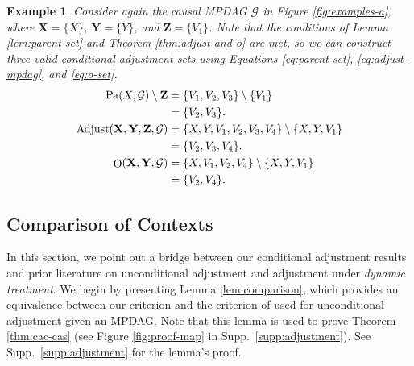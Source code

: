 \documentclass[twoside]{article}
\newtheorem{example}{Example}
\DeclareMathOperator{\Pa}{Pa}
\DeclareMathOperator{\Adjust}{Adjust}
\DeclareMathOperator{\Opt}{O}
\newcommand{\opt}[2][X,Y]{\Opt(\mb{#1},#2)}
\newcommand{\mb}[1]{\mathbf{#1}}
\newcommand{\g}[1][G]{\mathcal{#1}}
\begin{document}
\begin{example}
\label{ex:construct}
    Consider again the causal MPDAG $\g$ in Figure \ref{fig:examples-a}, where $\mb{X} = \{X\}$, $\mb{Y} = \{Y\}$, and $\mb{Z} = \{V_1\}$. Note that the conditions of Lemma \ref{lem:parent-set} and Theorem \ref{thm:adjust-and-o} are met, so we can construct three valid conditional adjustment sets using Equations \eqref{eq:parent-set}, \eqref{eq:adjust-mpdag}, and \eqref{eq:o-set}.
    \begingroup
    \allowdisplaybreaks
    \begin{align}
        \Pa(X, \g) \setminus \mb{Z} &= \{V_1,V_2,V_3\} \setminus \{V_1\} \notag\\
        &= \{V_2,V_3\}. \nonumber\\
        \Adjust(\mb{X,Y,Z},\g) &= \{X,Y, V_1,V_2,V_3,V_4\} \setminus \{X,Y,V_1\} \nonumber\\
        &= \{V_2,V_3,V_4\}. \nonumber\\
        \opt{\g} &= \{X,V_1,V_2,V_4\} \setminus \{X,Y,V_1\} \nonumber\\
        &= \{V_2,V_4\}. \nonumber
    \end{align}
    \endgroup
\end{example}







\subsection{Comparison of Contexts} 
\label{sec:comparison}

In this section, we point out a bridge between our conditional adjustment results and prior literature on unconditional adjustment and adjustment under \textit{dynamic treatment}. We begin by presenting Lemma \ref{lem:comparison}, which provides an equivalence between our criterion and the criterion of \cite{perkovic2017interpreting} used for unconditional adjustment given an MPDAG. Note that this lemma is used to prove Theorem \ref{thm:cac-cas} (see Figure \ref{fig:proof-map} in Supp.\ \ref{supp:adjustment}). See Supp.\ \ref{supp:adjustment} for the lemma's proof.

 
\end{document}
